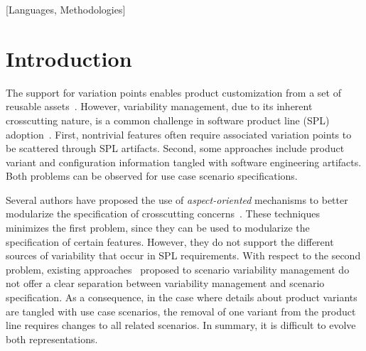 \documentclass{sig-alternate}
\begin{document}
[Languages,
Methodologies]\




\section{Introduction}
The support for variation points enables product customization from a set of
reusable assets~\cite{Pohl:2005aa}. However, variability management, due to its
inherent crosscutting nature, is a common challenge in software product line
(SPL) adoption~\cite{Clements:2001aa,Pohl:2005aa}. First, nontrivial features
often require associated variation points to be scattered through SPL artifacts.
Second, some approaches include product variant and configuration information
tangled with software engineering artifacts. Both problems can be observed for use case scenario
specifications.

Several authors have proposed the use of \emph{aspect-oriented} mechanisms to
better modularize the specification of crosscutting
concerns~\cite{Moreira:2004aa,Chitchyan:2007aa}. These techniques minimizes the
first problem, since they can be used to modularize the specification of certain
features. However, they do not support the different sources of variability that
occur in SPL requirements. With respect to the second problem, existing
approaches~\cite{Bertolino:2003aa,Eriksson:2005aa} proposed to
scenario variability management do not offer a clear separation between
variability management and scenario specification. As a consequence, in the case
where details about product variants are tangled with use case scenarios, the
removal of one variant from the product line requires changes to all related
scenarios. In summary, it is difficult to evolve both representations.
\end{document}
